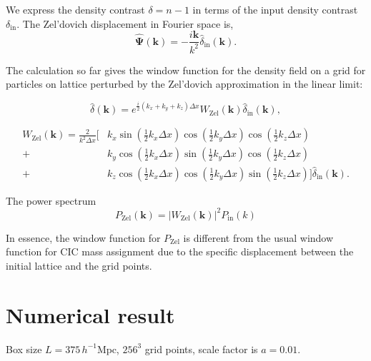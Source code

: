 \documentclass[a4paper,11pt]{article}
\begin{document}
We express the density contrast $\delta = n - 1$ in terms of
the input density contrast $\delta_\mathrm{in}$. The Zel'dovich
displacement in Fourier space is,
\begin{equation}
  \hat{\bm{\Psi}}(\bm{k}) = -\frac{i\bm{k}}{k^2} \hat{\delta}_\mathrm{in}(\bm{k}).
\end{equation}

The calculation so far gives the window function for the density
field on a grid for particles on lattice perturbed by the Zel'dovich
approximation in the linear limit:

\begin{equation}
  \hat{\delta}(\bm{k}) = e^{\frac{i}{2}  (k_x + k_y + k_z) \Delta x} W_\mathrm{Zel}(\bm{k}) \hat{\delta}_\mathrm{in}(\bm{k}),
\end{equation}

\begin{equation}
\begin{split}
  W_\mathrm{Zel}(\bm{k}) = \frac{2}{k^2 \Delta x}
              \bigg[
      &k_x \sin\left( \frac{1}{2} k_x \Delta x \right)
        \cos\left( \frac{1}{2} k_y \Delta x \right)
        \cos\left( \frac{1}{2} k_z \Delta x \right)\\
    + &k_y \cos\left( \frac{1}{2} k_x \Delta x \right)
        \sin\left( \frac{1}{2} k_y \Delta x \right)
        \cos\left( \frac{1}{2} k_z \Delta x \right)\\
    + &k_z \cos\left( \frac{1}{2} k_x \Delta x \right)
        \cos\left( \frac{1}{2} k_y \Delta x \right)
        \sin\left( \frac{1}{2} k_z \Delta x \right) \bigg]
    \hat{\delta}_\mathrm{in}(\bm{k}).
\end{split}
\end{equation}

The power spectrum
\begin{equation}
  \label{eq:power-spectrum}
  P_\mathrm{Zel}(\bm{k}) =  |W_\mathrm{Zel}(\bm{k})|^2 P_\mathrm{in}(k)
\end{equation}

In essence, the window function for $P_\mathrm{Zel}$ is different from
the usual window function for CIC mass assignment due to the specific displacement
between the initial lattice and the grid points.


\section{Numerical result}

Box size $L = 375 \, h^{-1} \mathrm{Mpc}$, $256^3$ grid points, scale
factor is $a=0.01$.
\end{document}
